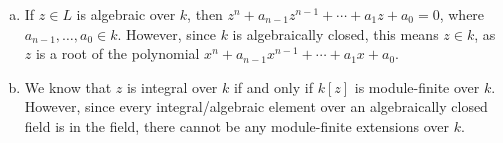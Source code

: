 \documentclass[10pt]{mypackage}
\begin{document}
\begin{solution}\hfill
  \begin{enumerate}[(a)]
    \item If $z\in L$ is algebraic over $k$, then $z^{n} + a_{n-1}z^{n-1} + \cdots + a_1 z + a_0 = 0$, where $a_{n-1},\dots,a_0\in k$. However, since $k$ is algebraically closed, this means $z\in k$, as $z$ is a root of the polynomial $x^{n} + a_{n-1}x^{n-1} + \cdots + a_1 x + a_0$.
    \item We know that $z$ is integral over $k$ if and only if $k\left[ z \right]$ is module-finite over $k$. However, since every integral/algebraic element over an algebraically closed field is in the field, there cannot be any module-finite extensions over $k$.
  \end{enumerate}
\end{solution}
\end{document}
